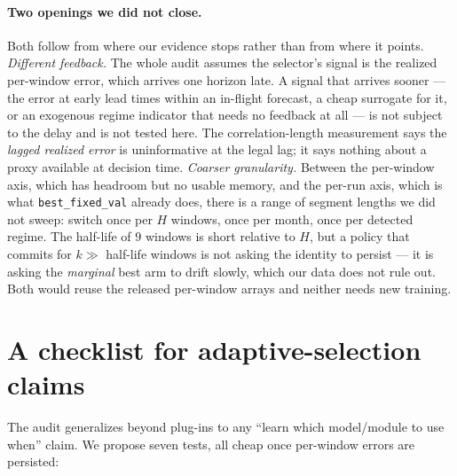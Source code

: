 \documentclass[a4paper,fleqn]{cas-sc}
\newcommand{\arm}[1]{\texttt{#1}}
\begin{document}
\paragraph{Two openings we did not close.}
Both follow from where our evidence stops rather than from where it points.
\emph{Different feedback.} The whole audit assumes the selector's signal is the
realized per-window error, which arrives one horizon late. A signal that arrives
sooner --- the error at early lead times within an in-flight forecast, a cheap
surrogate for it, or an exogenous regime indicator that needs no feedback at all
--- is not subject to the delay and is not tested here. The correlation-length
measurement says the \emph{lagged realized error} is uninformative at the legal
lag; it says nothing about a proxy available at decision time.
\emph{Coarser granularity.} Between the per-window axis, which has headroom but no
usable memory, and the per-run axis, which is what \arm{best\_fixed\_val} already
does, there is a range of segment lengths we did not sweep: switch once per $H$
windows, once per month, once per detected regime. The half-life of $9$ windows is
short relative to $H$, but a policy that commits for $k \gg$ half-life windows is
not asking the identity to persist --- it is asking the \emph{marginal} best arm to
drift slowly, which our data does not rule out. Both would reuse the released
per-window arrays and neither needs new training.

\section{A checklist for adaptive-selection claims}
\label{sec:checklist}

The audit generalizes beyond plug-ins to any ``learn which model/module to use
when'' claim. We propose seven tests, all cheap once per-window errors are
persisted:
\end{document}
